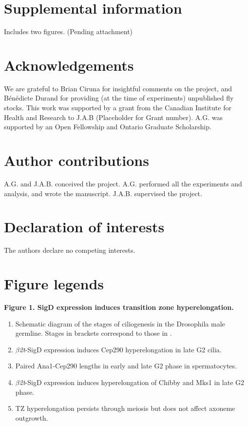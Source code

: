 \documentclass[12pt, twoside, letterpaper]{article}
\newcommand{\sigd}{$\beta$\textit{2t}-SigD}
\begin{document}
\begin{doublespacing}
\begin{linenumbers}
    \section{Supplemental information}
    Includes two figures. (Pending attachment)
    
    \section{Acknowledgements}
    We are grateful to Brian Ciruna for insightful comments on the project,
    and B{\'e}n{\'e}dicte Durand for providing (at the time of experiments)
    unpublished fly stocks.
    This work was supported by a grant from the Canadian Institute for
    Health and Research to J.A.B (Placeholder for Grant number).
    A.G. was supported by an Open Fellowship and Ontario Graduate Scholarship.
    
    \section{Author contributions}
    A.G. and J.A.B. conceived the project.
    A.G. performed all the experiments and analysis, and wrote the manuscript.
    J.A.B. supervised the project.
    
    \section{Declaration of interests}
    The authors declare no competing interests.

    \section{Figure legends}
    
    \textbf{Figure 1. SigD expression induces transition zone hyperelongation.}
    \begin{enumerate}[label={(\Alph*)}, nolistsep]
    \item Schematic diagram of the stages of ciliogenesis in the Drosophila male germline.
      Stages in brackets correspond to those in \citep{cenci1994chromatin}.
    \item \sigd{} expression induces Cep290 hyperelongation in late G2 cilia.
    \item Paired Ana1-Cep290 lengths in early and late G2 phase in spermatocytes.
    \item \sigd{} expression induces hyperelongation of Chibby and Mks1 in late G2 phase.
    \item TZ hyperelongation persists through meiosis but does not affect
      axoneme outgrowth.
    \end{enumerate}
    

\end{linenumbers}
\end{doublespacing}
\end{document}
